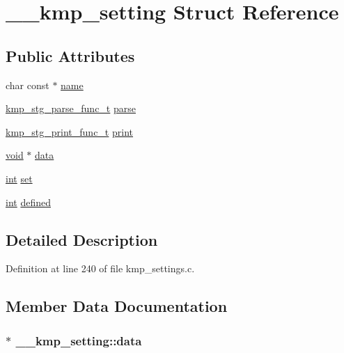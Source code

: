 \hypertarget{struct____kmp__setting}{\section{\-\_\-\-\_\-kmp\-\_\-setting Struct Reference}
\label{struct____kmp__setting}
}
\subsection*{Public Attributes}
\begin{DoxyCompactItemize}
\item 
char const $\ast$ \hyperlink{struct____kmp__setting_a861a8d3d2efb6a13416092e900db6a32}{name}
\item 
\hyperlink{kmp__settings_8c_a6853088345ceb631d3c1ed8510b042fb}{kmp\-\_\-stg\-\_\-parse\-\_\-func\-\_\-t} \hyperlink{struct____kmp__setting_a6484e637e780c6fb5b85e129e0e74e59}{parse}
\item 
\hyperlink{kmp__settings_8c_a5877f6ecc71e8e495a36967aa8f9bf21}{kmp\-\_\-stg\-\_\-print\-\_\-func\-\_\-t} \hyperlink{struct____kmp__setting_a411e543047308db1d704cbff3cf03c95}{print}
\item 
\hyperlink{ittnotify__static_8h_af941d56e55e3c5465135b60c4d6343ed}{void} $\ast$ \hyperlink{struct____kmp__setting_ae4e255f904312dff2f07fe34fa3edd31}{data}
\item 
\hyperlink{ittnotify__static_8h_a8b8dcd723308a8cb5d84277c7a3fff70}{int} \hyperlink{struct____kmp__setting_aa0dba7f42f393fcaf2d82bf985d10027}{set}
\item 
\hyperlink{ittnotify__static_8h_a8b8dcd723308a8cb5d84277c7a3fff70}{int} \hyperlink{struct____kmp__setting_a2dc6c85979b5c20f2abc6fe6673b8eff}{defined}
\end{DoxyCompactItemize}


\subsection{Detailed Description}


Definition at line 240 of file kmp\-\_\-settings.\-c.



\subsection{Member Data Documentation}
\hypertarget{struct____kmp__setting_ae4e255f904312dff2f07fe34fa3edd31}{
\subsubsection[{data}]{$\ast$ \-\_\-\-\_\-kmp\-\_\-setting\-::data}}\label{struct____kmp__setting_ae4e255f904312dff2f07fe34fa3edd31}


